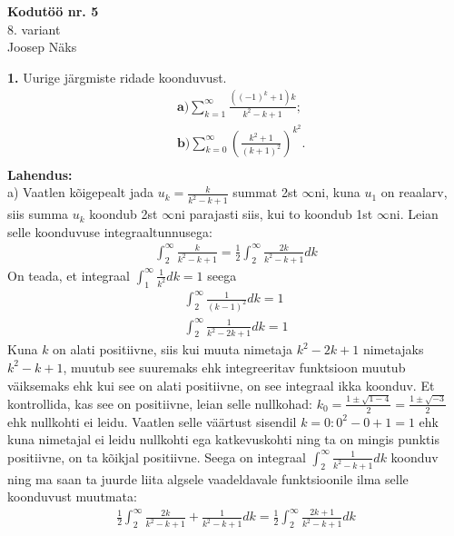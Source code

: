 \documentclass{article}
\begin{document}
\begin{center}
\Large\textbf{Kodut\"o\"o nr. 5}\\
8. variant\\
\small{Joosep N\"aks}
\end{center}
\textbf{1.} Uurige j\"argmiste ridade koonduvust.
\begin{equation*}
\begin{aligned}
&\mathbf{a)} \sum_{k=1}^\infty\frac{((-1)^k+1)k}{k^2-k+1};\\
&\mathbf{b)} \sum_{k=0}^\infty\left(\frac{k^2+1}{(k+1)^2}\right)^{k^2}.\\
\end{aligned}
\end{equation*}
\textbf{Lahendus:}\\
a) Vaatlen k\~oigepealt jada $u_k=\frac{k}{k^2-k+1}$ summat 2st $\infty$ni, kuna $u_1$ on reaalarv, siis summa $u_k$ koondub 2st $\infty$ni parajasti siis, kui to koondub 1st $\infty$ni. Leian selle koonduvuse integraaltunnusega:
\begin{equation*}
\begin{aligned}
\int_2^\infty\frac{k}{k^2-k+1}=\frac{1}{2}\int_2^\infty\frac{2k}{k^2-k+1}dk
\end{aligned}
\end{equation*}
On teada, et integraal $\int_1^\infty\frac{1}{k^2}dk=1$ seega
\begin{equation*}
\begin{aligned}
\int_2^\infty\frac{1}{(k-1)^2}dk=1\\
\int_2^\infty\frac{1}{k^2-2k+1}dk=1
\end{aligned}
\end{equation*}
Kuna $k$ on alati positiivne, siis kui muuta nimetaja $k^2-2k+1$ nimetajaks $k^2-k+1$, muutub see suuremaks ehk integreeritav funktsioon muutub v\"aiksemaks ehk kui see on alati positiivne, on see integraal ikka koonduv. Et kontrollida, kas see on positiivne, leian selle nullkohad: $k_0=\frac{1\pm\sqrt{1-4}}{2}=\frac{1\pm\sqrt{-3}}{2}$ ehk nullkohti ei leidu. Vaatlen selle v\"a\"artust sisendil $k=0: 0^2-0+1=1$ ehk kuna nimetajal ei leidu nullkohti ega katkevuskohti ning ta on mingis punktis positiivne, on ta k\~oikjal positiivne. Seega on integraal $\int_2^\infty\frac{1}{k^2-k+1}dk$ koonduv ning ma saan ta juurde liita algsele vaadeldavale funktsioonile ilma selle koonduvust muutmata:
\begin{equation*}
\begin{aligned}
\frac{1}{2}\int_2^\infty\frac{2k}{k^2-k+1}+\frac{1}{k^2-k+1}dk=\frac{1}{2}\int_2^\infty\frac{2k+1}{k^2-k+1}dk
\end{aligned}
\end{equation*}
\end{document}

